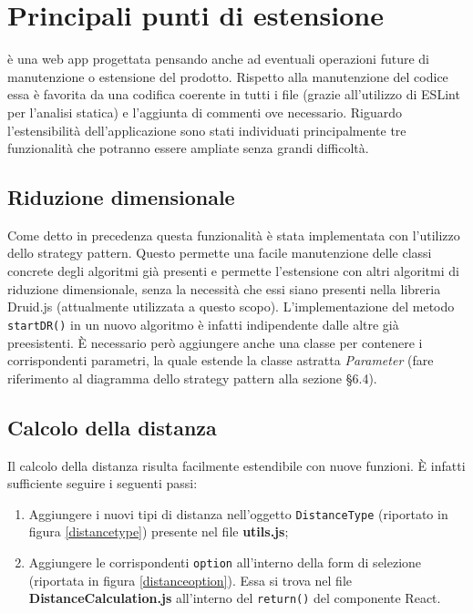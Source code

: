 \section{Principali punti di estensione}
\NomeProgetto{} è una web app progettata pensando anche ad eventuali operazioni future di manutenzione o estensione del prodotto. Rispetto alla manutenzione del codice essa è favorita da una codifica coerente in tutti i file (grazie all'utilizzo di ESLint per l'analisi statica) e l'aggiunta di commenti ove necessario.
Riguardo l'estensibilità dell'applicazione sono stati individuati principalmente tre funzionalità che potranno essere ampliate senza grandi difficoltà.

\subsection{Riduzione dimensionale}
Come detto in precedenza questa funzionalità è stata implementata con l'utilizzo dello strategy pattern. Questo permette una facile manutenzione delle classi concrete degli algoritmi già presenti e permette l'estensione con altri algoritmi di riduzione dimensionale, senza la necessità che essi siano presenti nella libreria Druid.js (attualmente utilizzata a questo scopo). L'implementazione del metodo \texttt{startDR()} in un nuovo algoritmo è infatti indipendente dalle altre già preesistenti. È necessario però aggiungere anche una classe per contenere i corrispondenti parametri, la quale estende la classe astratta \textit{Parameter} (fare riferimento al diagramma dello strategy pattern alla sezione \S 6.4).

\subsection{Calcolo della distanza}
Il calcolo della distanza risulta facilmente estendibile con nuove funzioni. È infatti sufficiente seguire i seguenti passi: 
\begin{enumerate}[label=\textbf{\arabic*})]
	\item Aggiungere i nuovi tipi di distanza nell'oggetto \texttt{DistanceType} (riportato in figura \ref{distancetype}) presente nel file \textbf{utils.js};
	\item Aggiungere le corrispondenti \texttt{option} all'interno della form di selezione (riportata in figura \ref{distanceoption}). Essa si trova nel file \textbf{DistanceCalculation.js} all'interno del \texttt{return()} del componente React.
\end{enumerate}

